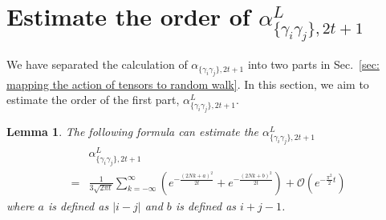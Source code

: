 \documentclass[showpacs,twocolumn,aps,prx,long bibliography,superscriptaddress,notitlepage]{revtex4-1}
\newtheorem{lemma}{Lemma}
\newcommand{\alpl}{\alpha_{\{\gamma_i\gamma_j\}, 2t+1}^{L}}
\begin{document}
\section{Estimate the order of $\alpha_{\{\gamma_i\gamma_j\}, 2t+1}^{L}$}
\label{sec: estimate the order of alpl}
We have separated the calculation of $\alpha_{\{\gamma_i\gamma_j\},2t+1}$ into two parts in Sec.~\ref{sec: mapping the action of tensors to random walk}. In this section, we aim to estimate the order of the first part, $\alpl$.
\begin{lemma}
\label{theorem: order of alpha l}
    The following formula can estimate the $\alpl$
    \begin{equation}
        \begin{aligned}
            &\alpl  \\ =& \frac{1}{3\sqrt{2\pi t}}  \sum_{k=-\infty}^{\infty} \left(e^{-\frac{(2Nk+a)^2}{2t}} + e^{-\frac{(2Nk+b)^2}{2t}} \right)+\mathcal{O}\left(e^{-\frac{\pi^2}{2}t}\right)
        \end{aligned}
    \end{equation}
    where $a$ is defined as $|i-j|$ and $b$ is defined as $i+j-1$.
\end{lemma}
\end{document}
